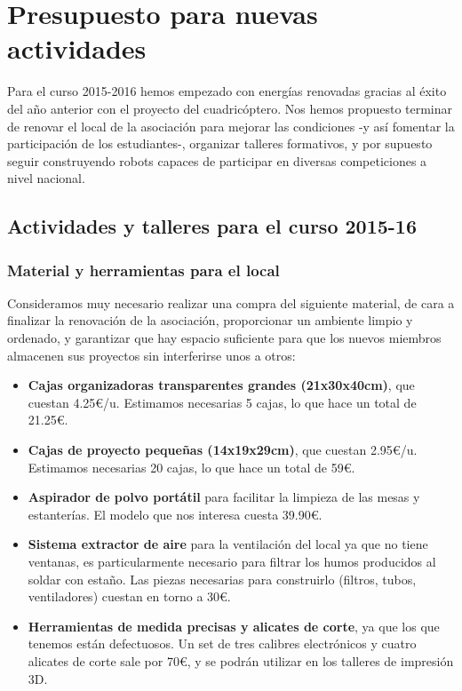 \documentclass[12pt,twoside]{report}
\begin{document}

\chapter{Presupuesto para nuevas actividades}


Para el curso 2015-2016 hemos empezado con energías renovadas gracias al éxito del año anterior con el proyecto del cuadricóptero. Nos hemos propuesto terminar de renovar el local de la asociación para mejorar las condiciones -y así fomentar la participación de los estudiantes-, organizar talleres formativos, y por supuesto seguir construyendo robots capaces de participar en diversas competiciones a nivel nacional.


\section{Actividades y talleres para el curso 2015-16}

\subsection{Material y herramientas para el local}

Consideramos muy necesario realizar una compra del siguiente material, de cara a finalizar la renovación de la asociación, proporcionar un ambiente limpio y ordenado, y garantizar que hay espacio suficiente para que los nuevos miembros almacenen sus proyectos sin interferirse unos a otros:

\begin{itemize}
\item \textbf{Cajas organizadoras transparentes grandes (21x30x40cm)}, que cuestan 4.25\euro{}/u. Estimamos necesarias 5 cajas, lo que hace un total de 21.25\euro{}.
\item \textbf{Cajas de proyecto pequeñas (14x19x29cm)}, que cuestan 2.95\euro{}/u. Estimamos necesarias 20 cajas, lo que hace un total de 59\euro{}.
\item \textbf{Aspirador de polvo portátil} para facilitar la limpieza de las mesas y estanterías. El modelo que nos interesa cuesta 39.90\euro{}.
\item \textbf{Sistema extractor de aire} para la ventilación del local ya que no tiene ventanas, es particularmente necesario para filtrar los humos producidos al soldar con estaño. Las piezas necesarias para construirlo (filtros, tubos, ventiladores) cuestan en torno a 30\euro{}.
\item \textbf{Herramientas de medida precisas y alicates de corte}, ya que los que tenemos están defectuosos. Un set de tres calibres electrónicos y cuatro alicates de corte sale por 70\euro{}, y se podrán utilizar en los talleres de impresión 3D.
\end{itemize}
\end{document}
